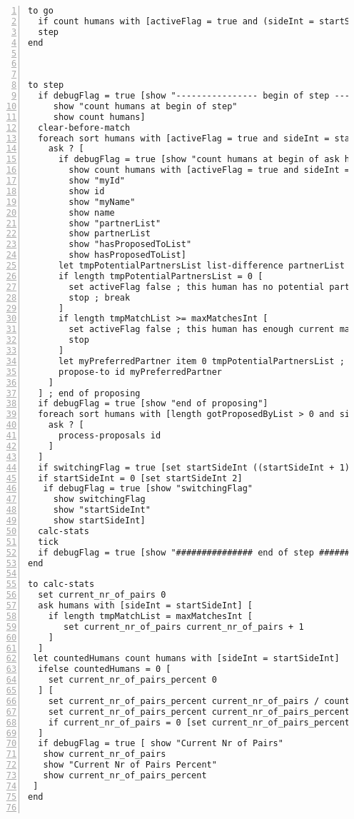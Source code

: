 \begin{lstlisting}[numbers=left, breaklines=true]
to go
  if count humans with [activeFlag = true and (sideInt = startSideInt or switchingFlag = true)] = 0 [stop]
  step
end



to step
  if debugFlag = true [show "---------------- begin of step ----------------"
     show "count humans at begin of step"
     show count humans]
  clear-before-match
  foreach sort humans with [activeFlag = true and sideInt = startSideInt] [ ; start of proposing
    ask ? [
      if debugFlag = true [show "count humans at begin of ask humans with activeFlag=true and sideInt=startSideInt"
        show count humans with [activeFlag = true and sideInt = startSideInt]
        show "myId"
        show id
        show "myName"
        show name
        show "partnerList"
        show partnerList
        show "hasProposedToList"
        show hasProposedToList]
      let tmpPotentialPartnersList list-difference partnerList hasProposedToList ; set-difference of partnerList \ hasProposedToList
      if length tmpPotentialPartnersList = 0 [
        set activeFlag false ; this human has no potential partners to propose to
        stop ; break
      ]
      if length tmpMatchList >= maxMatchesInt [
        set activeFlag false ; this human has enough current matches
        stop
      ]
      let myPreferredPartner item 0 tmpPotentialPartnersList ; most preferred partner from tmp...List
      propose-to id myPreferredPartner
    ]
  ] ; end of proposing
  if debugFlag = true [show "end of proposing"]
  foreach sort humans with [length gotProposedByList > 0 and sideInt != startSideInt] [
    ask ? [
      process-proposals id
    ]
  ]
  if switchingFlag = true [set startSideInt ((startSideInt + 1) mod 2)]
  if startSideInt = 0 [set startSideInt 2]
   if debugFlag = true [show "switchingFlag"
     show switchingFlag
     show "startSideInt"
     show startSideInt]
  calc-stats
  tick
  if debugFlag = true [show "############### end of step ###############"]
end

to calc-stats
  set current_nr_of_pairs 0
  ask humans with [sideInt = startSideInt] [
    if length tmpMatchList = maxMatchesInt [
       set current_nr_of_pairs current_nr_of_pairs + 1
    ]
  ]
 let countedHumans count humans with [sideInt = startSideInt]
  ifelse countedHumans = 0 [
    set current_nr_of_pairs_percent 0
  ] [
    set current_nr_of_pairs_percent current_nr_of_pairs / countedHumans
    set current_nr_of_pairs_percent current_nr_of_pairs_percent * 100
    if current_nr_of_pairs = 0 [set current_nr_of_pairs_percent 0]
  ]
  if debugFlag = true [ show "Current Nr of Pairs"
   show current_nr_of_pairs
   show "Current Nr of Pairs Percent"
   show current_nr_of_pairs_percent
 ]
end


\end{lstlisting}
